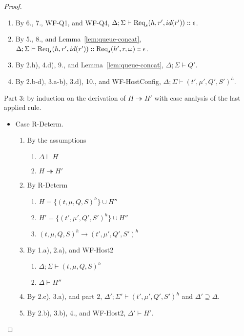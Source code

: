 \begin{proof}
\begin{itemize}
\begin{enumerate}
\item By 6., 7., WF-Q1, and WF-Q4, $\Delta ; \Sigma \vdash {\textrm{Req}_s(h, r', id(r'))} :: \epsilon$.
\item By 5., 8., and Lemma~\ref{lem:queue-concat}, $\Delta ; \Sigma \vdash {\textrm{Req}_s(h, r', id(r'))} :: {\textrm{Req}_s(h', r, \omega)} :: \epsilon$.
\item By 2.h), 4.d), 9., and Lemma~\ref{lem:queue-concat}, $\Delta ; \Sigma \vdash Q'$.
\item By 2.b-d), 3.a-b), 3.d), 10., and WF-HostConfig, $\Delta ; \Sigma \vdash (t', \mu', Q', S')^h$.
\end{enumerate}

\end{itemize}

Part 3: by induction on the derivation of $H \twoheadrightarrow H'$ with case analysis of the last applied rule.

\begin{itemize}
\item Case R-Determ.
\begin{enumerate}
\item By the assumptions
  \begin{enumerate}[label=(\alph*)]
  \item $\Delta \vdash H$
  \item $H \twoheadrightarrow H'$
  \end{enumerate}
\item By R-Determ
  \begin{enumerate}[label=(\alph*)]
  \item $H = \{ (t, \mu, Q, S)^h \} \cup H''$
  \item $H' = \{ (t', \mu', Q', S')^h \} \cup H''$
  \item $(t, \mu, Q, S)^h \longrightarrow (t', \mu', Q', S')^h$
  \end{enumerate}
\item By 1.a), 2.a), and WF-Host2
  \begin{enumerate}[label=(\alph*)]
  \item $\Delta ; \Sigma \vdash (t, \mu, Q, S)^h$
  \item $\Delta \vdash H''$
  \end{enumerate}
\item By 2.c), 3.a), and part 2, $\Delta' ; \Sigma' \vdash (t', \mu', Q', S')^h$ and $\Delta' \supseteq \Delta$.
\item By 2.b), 3.b), 4., and WF-Host2, $\Delta' \vdash H'$.
\end{enumerate}


\end{itemize}
\end{proof}
